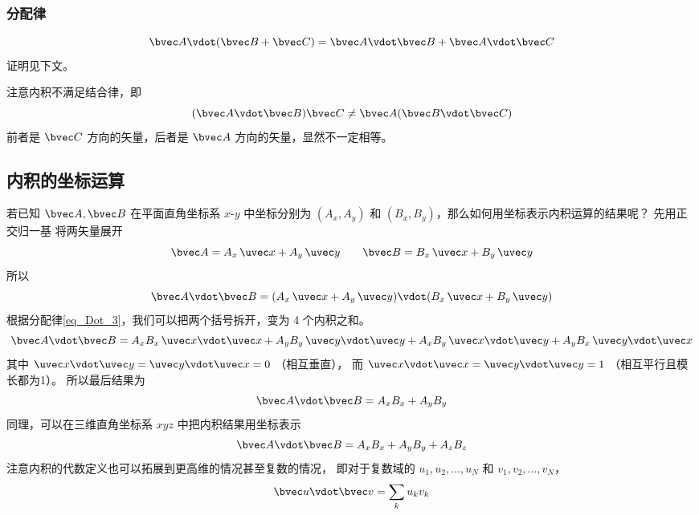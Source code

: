 \subsubsection{分配律}
\begin{equation}\label{eq_Dot_3}
\bvec A \vdot (\bvec B + \bvec C) = \bvec A \vdot \bvec B + \bvec A \vdot \bvec C
\end{equation}
证明见下文。

注意内积不满足结合律，即
\begin{equation}
(\bvec A \vdot \bvec B) \bvec C \ne  \bvec A (\bvec B \vdot \bvec C)
\end{equation}
前者是 $\bvec C$ 方向的矢量，后者是 $\bvec A$ 方向的矢量，显然不一定相等。

\subsection{内积的坐标运算}
若已知 $\bvec A, \bvec B$ 在平面直角坐标系 $x$-$y$ 中坐标分别为 $(A_x, A_y)$ 和  $(B_x, B_y)$，那么如何用坐标表示内积运算的结果呢？ 先用正交归一基 将两矢量展开 %
\begin{equation}
\bvec A = A_x \,\uvec x + A_y \,\uvec y \qquad \bvec B = B_x \,\uvec x + B_y \,\uvec y
\end{equation}
所以
\begin{equation}
\bvec A \vdot \bvec B = (A_x \,\uvec x + A_y \,\uvec y) \vdot (B_x \,\uvec x + B_y \,\uvec y)
\end{equation}
根据分配律\autoref{eq_Dot_3}，我们可以把两个括号拆开，变为 4 个内积之和。 
\begin{equation}
\bvec A \vdot \bvec B = A_x B_x \,\uvec x \vdot \uvec x + A_y B_y \,\uvec y \vdot \uvec y + A_x B_y \,\uvec x \vdot \uvec y + A_y B_x \,\uvec y \vdot \uvec x
\end{equation}
其中 $\uvec x \vdot \uvec y = \uvec y \vdot \uvec x = 0$ （相互垂直）， 而 $\uvec x \vdot \uvec x = \uvec y \vdot \uvec y = 1$ （相互平行且模长都为1）。 所以最后结果为
\begin{equation}\label{eq_Dot_5}
\bvec A \vdot \bvec B = A_x B_x + A_y B_y
\end{equation}
同理，可以在三维直角坐标系 $xyz$ 中把内积结果用坐标表示
\begin{equation}\label{eq_Dot_4}
\bvec A \vdot \bvec B = A_x B_x + A_y B_y + A_z B_z	
\end{equation}
注意内积的代数定义也可以拓展到更高维的情况甚至复数的情况， 即对于复数域的 $u_1, u_2, \dots, u_N$ 和 $v_1, v_2, \dots, v_N$，
\begin{equation}
\bvec u \vdot \bvec v = \sum_k u_k v_k
\end{equation}

